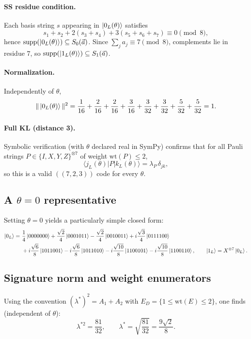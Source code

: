 \documentclass[11pt]{article}
\begin{document}
\paragraph{SS residue condition.}
Each basis string \(s\) appearing in \(\ket{0_L(\theta)}\) satisfies
\[
s_1+s_2+2(s_3+s_4)+3(s_5+s_6+s_7)\equiv 0\pmod 8,
\]
hence \(\mathrm{supp}(\ket{0_L(\theta)})\subseteq S_0(\vec a)\).
Since \(\sum_j a_j\equiv 7\pmod 8\), complements lie in residue \(7\), so \(\mathrm{supp}(\ket{1_L(\theta)})\subseteq S_1(\vec a)\).

\paragraph{Normalization.}
Independently of \(\theta\),
\[
\|\ket{0_L(\theta)}\|^2
=\frac{1}{16}+\frac{2}{16}+\frac{2}{16}+\frac{3}{16}+\frac{3}{32}+\frac{3}{32}+\frac{5}{32}+\frac{5}{32}=1.
\]

\paragraph{Full KL (distance 3).}
Symbolic verification (with \(\theta\) declared real in SymPy) confirms that for all Pauli strings
\(P\in\{I,X,Y,Z\}^{\otimes 7}\) of weight \(\mathrm{wt}(P)\le 2\),
\[
\langle j_L(\theta)|P|k_L(\theta)\rangle=\lambda_P\,\delta_{jk},
\]
so this is a valid \(((7,2,3))\) code for every \(\theta\).

\subsection{A \texorpdfstring{$\theta=0$}{theta=0} representative}

Setting \(\theta=0\) yields a particularly simple closed form:
\[
\begin{aligned}
\ket{0_L}
=&\ \frac{1}{4}\ket{0000000}
+\frac{\sqrt2}{4}\ket{0001011}
-\frac{\sqrt2}{4}\ket{0010011}
+i\frac{\sqrt3}{4}\ket{0111100}\\
&\ +i\frac{\sqrt6}{8}\ket{1011001}
-i\frac{\sqrt6}{8}\ket{1011010}
-i\frac{\sqrt{10}}{8}\ket{1100101}
-i\frac{\sqrt{10}}{8}\ket{1100110},
\qquad
\ket{1_L}=X^{\otimes 7}\ket{0_L}.
\end{aligned}
\]

\subsection{Signature norm and weight enumerators}

Using the convention \((\lambda^\ast)^2=A_1+A_2\) with \(E_D=\{1\le \mathrm{wt}(E)\le 2\}\), one finds (independent of \(\theta\)):
\[
\boxed{\lambda^{\ast 2}=\frac{81}{32},\qquad \lambda^\ast=\sqrt{\frac{81}{32}}=\frac{9\sqrt2}{8}.}
\]
\end{document}
